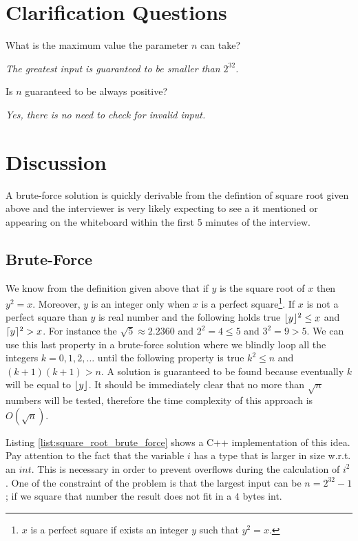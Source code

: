 \section{Clarification Questions}
\begin{QandA}
	\item What is the maximum value the parameter $n$ can take?
	\begin{answered}
		\textit{The greatest input is guaranteed to be smaller than $2^{32}$.}
	\end{answered}
	
	\item Is $n$ guaranteed to be always positive?
	\begin{answered}
		\textit{Yes, there is no need to check for invalid input.}
	\end{answered}
\end{QandA}

\section{Discussion}
A brute-force solution is quickly derivable from the defintion of square root given above and the interviewer
is very likely expecting to see a it mentioned or appearing on the whiteboard
within the first 5 minutes of the interview. 

\subsection{Brute-Force}
We know from the definition given above that if $y$ is the square root of $x$ then $y^2 = x$. Moreover,
$y$ is an integer only when $x$ is a perfect square\footnote{$x$ is a perfect square if exists an integer $y$ such that $y^2=x$.}. 
If $x$ is not a perfect square than $y$ is real number and the following holds true
$\lfloor y\rfloor^2 \leq x$ and $\lceil y\rceil^2 > x$. For instance the $\sqrt{5} \approx 2.2360$ and $2^2=4 \leq 5$ and $3^2=9 > 5$.
We can use this last property in a brute-force solution where we blindly loop all the integers $k=0,1,2,\ldots$ until 
the following property is true $k^2\leq n$ and $(k+1)(k+1) > n$.
A solution is guaranteed to be found because eventually $k$ will be equal to $\lfloor y\rfloor$.
It should be immediately clear that no more than $\sqrt{n}$ numbers will be tested, therefore the time complexity of this approach is $O(\sqrt{n})$.

Listing \ref{list:square_root_brute_force} shows a C++ implementation of this idea.
Pay attention to the fact that the variable $i$ has a type that is larger in size w.r.t. an
$int$. This is necessary in order to prevent overflows during the calculation of $i^2$. 
One of the constraint of the problem is that the largest input can be $n=2^{32}-1$; if we square that number the result does not fit in a $4$ bytes int.


